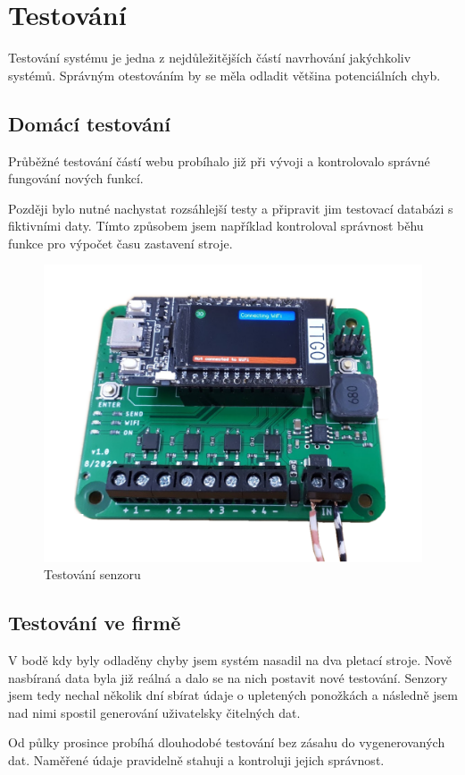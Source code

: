\chapter{Testování}
Testování systému je jedna z nejdůležitějších částí navrhování jakýchkoliv systémů.
Správným otestováním by se měla odladit většina potenciálních chyb.

\section{Domácí testování}
Průběžné testování částí webu probíhalo již při vývoji a kontrolovalo správné fungování nových funkcí.

Později bylo nutné nachystat rozsáhlejší testy a připravit jim testovací databázi s fiktivními daty.
Tímto způsobem jsem například kontroloval správnost běhu funkce pro výpočet času zastavení stroje.

\begin{figure}[htbp]
    \centering
    \includegraphics[width=\textwidth]{img/Testovani.png}
    \caption{Testování senzoru}
    \label{fig:SenzorNaStroji}
\end{figure}

\section{Testování ve firmě}
V bodě kdy byly odladěny chyby jsem systém nasadil na dva pletací stroje.
Nově nasbíraná data byla již reálná a dalo se na nich postavit nové testování.
Senzory jsem tedy nechal několik dní sbírat údaje o upletených ponožkách a následně jsem nad nimi spostil generování uživatelsky čitelných dat.

Od půlky prosince probíhá dlouhodobé testování bez zásahu do vygenerovaných dat. Naměřené údaje pravidelně stahuji a kontroluji jejich správnost.

\newpage